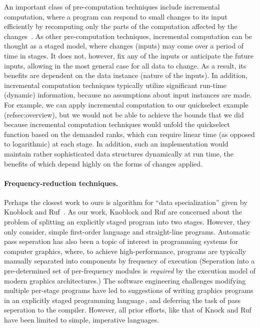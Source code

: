 An important class of pre-computation techniques include incremental
computation, where a program can respond to small changes to its input
efficiently by recomputing only the parts of the computation affected
by the
changes~\cite{DemersReTe81,PughTe89,RamalingamRe93,AcarBlBlHaTa09}.
As other pre-computation techniques, incremental computation can be
thought as a staged model, where changes (inputs) may come over a
period of time in stages. 
%
It does not, however, fix any of the inputs or anticipate the future
inputs, allowing in the most general case for all data to change. As a
result, its benefits are dependent on the data instance (nature of the
inputs). In addition, incremental computation techniques typically
utilize significant run-time (dynamic) information, because no
assumptions about input instances are made.  For example, we can apply
incremental computation to our quickselect example
(ref{sec:overview}), but we would not be able to achieve the bounds
that we did because incremental computation techniques would unfold
the quickselect function based on the demanded ranks, which can
require linear time (as opposed to logarithmic) at each stage.  In
addition, such an implementation would maintain rather sophisticated
data structures dynamically at run time, the benefits of which depend
highly on the forms of changes applied.


\paragraph{Frequency-reduction techniques.}
Perhaps the closest work to ours is algorithm for ``data
specialization'' given by Knoblock and Ruf~\cite{knoblock96}.  As our
work, Knoblock and Ruf are concerned about the problem of splitting an
explicitly staged program into two stages.  However, they only
consider, simple first-order language and straight-line
programs. Automatic pass seperation has also been a topic of interest
in programming systems for computer graphics, where, to achieve
high-performance, programs are typically manually separated into
components by frequency of execution (Seperation into a pre-determined
set of per-frequency modules is \emph{required} by the execution model
of modern graphics architectures.)  The software engineering
challenges modifying multiple per-stage programs have led to
suggestions of writing graphics programs in an explicitly staged
programming language\,\cite{Proudfoot:2001,Foley:2011,He:2014}, and
deferring the task of pass seperation to the compiler. However, all
prior efforts, like that of Knock and Ruf\,\cite{knoblock96} have been
limited to simple, imperative languages.  



